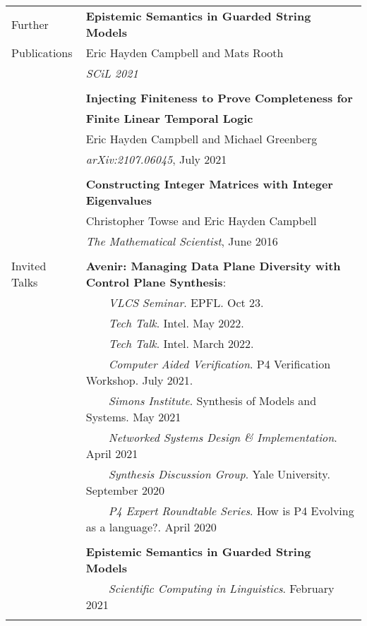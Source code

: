 \documentclass[letterpaper,10pt,oneside]{article}
\newcommand{\tabitem}{~~\llap{\textbullet}~~}
\begin{document}
\begin{tabular}{@{} l l }

  \Large{Further}
  & \textbf{Epistemic Semantics in Guarded String Models}\\
  \Large{Publications}
  & Eric Hayden Campbell and Mats Rooth \\
  & \textit{SCiL 2021} \\
  & \\

  & \textbf{Injecting Finiteness to Prove Completeness for} \\
  & \textbf{Finite Linear Temporal Logic} \\
  & Eric Hayden Campbell and Michael Greenberg \\
  & \textit{arXiv:2107.06045}, July 2021\\
  &\\

  & \textbf{Constructing Integer Matrices with Integer Eigenvalues} \\
  & Christopher Towse and Eric Hayden Campbell \\
  & \textit{The Mathematical Scientist}, June 2016 \\
  & \\

  \Large{Invited Talks}
  & \textbf{Avenir: Managing Data Plane Diversity with Control Plane Synthesis}: \\
      & \tabitem \textit{VLCS Seminar}. EPFL. Oct 23. \\
      & \tabitem \textit{Tech Talk}. Intel. May 2022. \\
      & \tabitem \textit{Tech Talk}. Intel. March 2022. \\
      & \tabitem \textit{Computer Aided Verification}. P4 Verification Workshop. July 2021.\\
      & \tabitem \textit{Simons Institute}. Synthesis of Models and Systems. May 2021\\
      & \tabitem \textit{Networked Systems Design \& Implementation}. April 2021\\
      & \tabitem \textit{Synthesis Discussion Group}. Yale University.  September 2020\\
      & \tabitem \textit{P4 Expert Roundtable Series}. How is P4 Evolving as a language?. April 2020\\
  & \\
  & \textbf{Epistemic Semantics in Guarded String Models} \\
  & \tabitem \textit{Scientific Computing in Linguistics}. February 2021\\
  & \\


\end{tabular}
\end{document}
